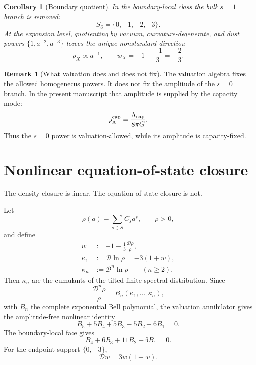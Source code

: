 \documentclass[aps,prd,reprint,nofootinbib,superscriptaddress,floatfix]{revtex4-2}
\numberwithin{equation}{section}
\theoremstyle{definition}
\newtheorem{remark}{Remark}[section]
\theoremstyle{plain}
\newtheorem{corollary}{Corollary}[section]
\newcommand{\Dil}{\mathscr D}
\begin{document}
\begin{corollary}[Boundary quotient]\label{cor:boundary-quotient}
In the boundary-local class the bulk \(s=1\) branch is removed:
\begin{equation}
S_\partial=\{0,-1,-2,-3\}.
\end{equation}
At the expansion level, quotienting by vacuum, curvature-degenerate, and dust powers \(\{1,a^{-2},a^{-3}\}\) leaves the unique nonstandard direction
\begin{equation}
\boxed{
\rho_X\propto a^{-1},
\qquad
w_X=-1-\frac{-1}{3}=-\frac23.
}
\end{equation}
\end{corollary}

\begin{remark}[What valuation does and does not fix]
The valuation algebra fixes the allowed homogeneous powers.  It does not fix the amplitude of the \(s=0\) branch.  In the present manuscript that amplitude is supplied by the capacity mode:
\[
\rho_\Lambda^{\rm cap}=\frac{\Lambda_{\rm cap}}{8\pi G}.
\]
Thus the \(s=0\) power is valuation-allowed, while its amplitude is capacity-fixed.
\end{remark}


\section{Nonlinear equation-of-state closure}\label{sec:w-closure}

The density closure is linear.  The equation-of-state closure is not.

Let
\begin{equation}
\rho(a)=\sum_{s\in S}C_sa^s,\qquad \rho>0,
\end{equation}
and define
\begin{equation}
\begin{aligned}
w&:=-1-\frac{1}{3}\frac{\Dil\rho}{\rho},\\
\kappa_1&:=\Dil\ln\rho=-3(1+w),\\
\kappa_{n}&:=\Dil^n\ln\rho\qquad(n\ge2).
\end{aligned}
\end{equation}
Then \(\kappa_n\) are the cumulants of the tilted finite spectral distribution.  Since
\begin{equation}
\frac{\Dil^n\rho}{\rho}=B_n(\kappa_1,\ldots,\kappa_n),
\end{equation}
with \(B_n\) the complete exponential Bell polynomial, the valuation annihilator gives the amplitude-free nonlinear identity
\begin{equation}
\boxed{
B_5+5B_4+5B_3-5B_2-6B_1=0.
}
\end{equation}
The boundary-local face gives
\begin{equation}
\boxed{
B_4+6B_3+11B_2+6B_1=0.
}
\end{equation}
For the endpoint support \(\{0,-3\}\),
\begin{equation}
\boxed{
\Dil w=3w(1+w).
}
\end{equation}
\end{document}
